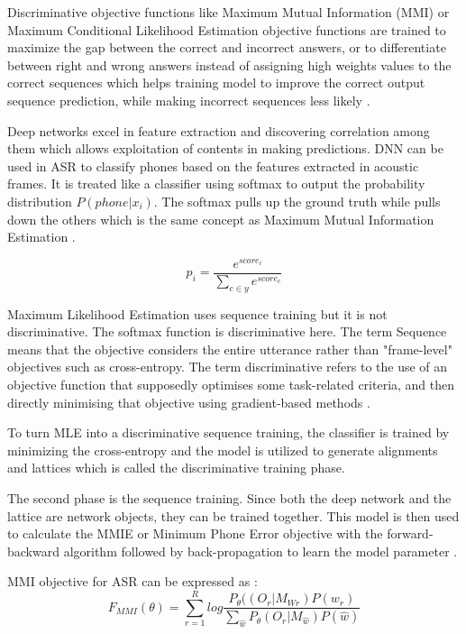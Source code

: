 Discriminative objective functions like Maximum Mutual Information (MMI) or Maximum Conditional Likelihood Estimation objective functions are trained to maximize the gap between the correct and incorrect answers, or to differentiate between right and wrong answers instead of assigning high weights values to the correct sequences which helps training model to improve the correct output sequence prediction, while making incorrect sequences less likely \cite{povey_purely_2016}. 

Deep networks excel in feature extraction and discovering correlation among them which allows exploitation of contents in making predictions. DNN can be used in ASR to classify phones based on the features extracted in acoustic frames. It is treated like a classifier using softmax to output the probability distribution $P(phone | x_{i})$. The softmax pulls up the ground truth while pulls down the others which is the same concept as Maximum Mutual Information Estimation \cite{wiesner_lattice_2020}.

\begin{equation}
 p_{i} = \frac{e^{score_{i}}}{\sum_{c \in y} e^{score_c}}
\end{equation}

Maximum Likelihood Estimation uses sequence training but it is not discriminative. The softmax function is discriminative here. The term Sequence means that the objective considers the entire utterance rather than "frame-level" objectives such as cross-entropy. The term discriminative refers to the use of an objective function that supposedly optimises some task-related criteria, and then directly minimising that objective using gradient-based methods \cite{noauthor_lattice_nodate}.

To turn MLE into a discriminative sequence training, the classifier is trained by minimizing the cross-entropy and the model is utilized to generate alignments and lattices which is called the discriminative training phase. 

The second phase is the sequence training. Since both the deep network and the lattice are network objects, they can be trained together. This model is then used to calculate the MMIE or Minimum Phone Error objective with the forward-backward algorithm followed by back-propagation to learn the model parameter \cite{wiesner_lattice_2020}.

MMI objective for ASR can be expressed as \cite{noauthor_lattice_nodate}:
\begin{equation}
    F_{MMI}(\theta) = \sum_{r=1}^{R} log \frac{P_{\theta}((O_{r}|M_{Wr})P(w_{r})}{\sum_{\hat{w}}P_{\theta}(O_{r}|M_{\hat{w}})P(\hat{w})} 
\end{equation}

